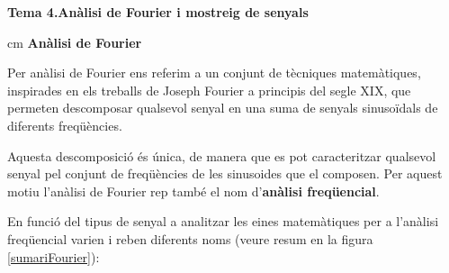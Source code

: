 \documentclass{article}
\begin{document}
\textbf{\Large Tema 4.An\`alisi de Fourier i mostreig de senyals}

 cm
\textbf{\large An\`alisi de Fourier}

Per an\`alisi de Fourier ens referim a un conjunt de t\`ecniques matem\`atiques,
inspirades en els treballs de Joseph Fourier a principis del segle XIX, que
permeten descomposar qualsevol senyal en una suma de senyals sinuso\"idals
de diferents freq\"u\`encies.

Aquesta descomposici\'o \'es \'unica, de manera que es pot caracteritzar qualsevol 
senyal pel conjunt de freq\"u\`encies de les sinusoides que el composen. Per aquest
motiu l'an\`alisi de Fourier rep tamb\'e el nom d'\textbf{an\`alisi freq\"uencial}.

En funci\'o del tipus de senyal a analitzar les eines matem\`atiques per a l'an\`alisi
freq\"uencial varien i reben diferents noms (veure resum en la figura \ref{sumariFourier}):
\end{document}
